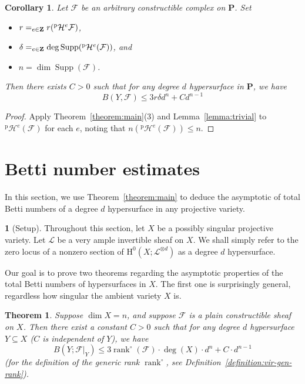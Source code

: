 \documentclass[english]{smfart}
\let\sum\relax\DeclareMathSymbol{\sum}{\mathop}{fourier}{80}
\renewcommand{\mathbb}{\mathbf}
\renewcommand{\leq}{\leqslant}
\renewcommand{\subset}{\subseteq}
\theoremstyle{remark}
\theoremstyle{plain}
\newtheorem{theorem}[remark]{Theorem}
\newtheorem{corollary}[remark]{Corollary}
\theoremstyle{definition}
\numberwithin{equation}{remark}
\theoremstyle{void}
\newtheorem{situation}[remark]{}
\begin{document}
\begin{corollary}\label{corollary:bound-any}
Let \(\mathcal{F}\) be an arbitrary constructible complex on
\(\mathbb{P}\).  Set
\begin{itemize}
\item \(r = \sum_{e\in \mathbb{Z}} r({}^{\mathrm{p}}\mathcal{H}^{e}\mathcal{F})\),
\item
\(\delta = \sum_{e\in \mathbb{Z}}\deg\operatorname{Supp}({}^{\mathrm{p}}\mathcal{H}^{e}(\mathcal{F}))\),
and
\item \(n = \dim \operatorname{Supp}(\mathcal{F})\).
\end{itemize}
Then there exists \(C > 0\) such that for any degree \(d\)
hypersurface in \(\mathbb{P}\), we have
\[
B(Y,\mathcal{F}) \leq 3r\delta d^{n} + C d^{n-1}
\]
\end{corollary}

\begin{proof}
Apply Theorem~\ref{theorem:main}(3) and Lemma~\ref{lemma:trivial} to
\({}^{\mathrm{p}}\mathcal{H}^{e}(\mathcal{F})\) for each \(e\), noting
that \(n({}^{\mathrm{p}}\mathcal{H}^{e}(\mathcal{F})) \leq n\).
\end{proof}


\section{Betti number estimates}
\label{sec:applications}

In this section, we use Theorem~\ref{theorem:main} to deduce the
asymptotic of total Betti numbers of a degree \(d\) hypersurface in
any projective variety.


\begin{situation}[Setup]
Throughout this section, let \(X\) be a possibly singular projective
variety.  Let \(\mathscr{L}\) be a very ample invertible sheaf on \(X\).
We shall simply refer to the zero locus of a nonzero section of
\(\mathrm{H}^0(X;\mathscr{L}^{\otimes d})\) as a degree \(d\)
hypersurface.
\end{situation}

Our goal is to prove two theorems regarding the asymptotic properties
of the total Betti numbers of hypersurfaces in \(X\).  The first one
is surprisingly general, regardless how singular the ambient variety
\(X\) is.

\begin{theorem}\label{theorem:arbitrary}
Suppose \(\dim X = n\), and suppose \(\mathcal{F}\) is
a plain constructible sheaf on \(X\).  Then there exist a constant \(C> 0\) such
that for any degree \(d\) hypersurface \(Y \subset X\) (\(C\) is
independent of \(Y\)), we have
\[
B(Y;\mathcal{F}|_{Y}) \leq 3 \operatorname{rank}^{\circ}(\mathcal{F}) \cdot \deg(X) \cdot d^n + C \cdot d^{n-1}
\]
(for the definition of the generic rank
\(\operatorname{rank}^{\circ}\), see
Definition~\ref{definition:vir-gen-rank}).
\end{theorem}
\end{document}
